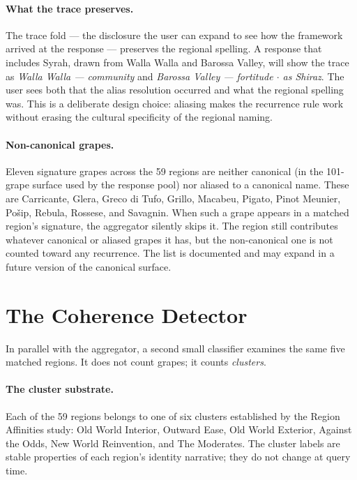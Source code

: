 \documentclass[11pt]{article}
\begin{document}
\paragraph{What the trace preserves.}
The trace fold --- the disclosure the user can expand to see how the framework arrived at the response --- preserves the regional spelling. A response that includes Syrah, drawn from Walla Walla and Barossa Valley, will show the trace as \emph{Walla Walla --- community} and \emph{Barossa Valley --- fortitude $\cdot$ as Shiraz}. The user sees both that the alias resolution occurred and what the regional spelling was. This is a deliberate design choice: aliasing makes the recurrence rule work without erasing the cultural specificity of the regional naming.

\paragraph{Non-canonical grapes.}
Eleven signature grapes across the 59 regions are neither canonical (in the 101-grape surface used by the response pool) nor aliased to a canonical name. These are Carricante, Glera, Greco di Tufo, Grillo, Macabeu, Pigato, Pinot Meunier, Po\v{s}ip, Rebula, Rossese, and Savagnin. When such a grape appears in a matched region's signature, the aggregator silently skips it. The region still contributes whatever canonical or aliased grapes it has, but the non-canonical one is not counted toward any recurrence. The list is documented and may expand in a future version of the canonical surface.

\section{The Coherence Detector}

In parallel with the aggregator, a second small classifier examines the same five matched regions. It does not count grapes; it counts \emph{clusters}.

\paragraph{The cluster substrate.}
Each of the 59 regions belongs to one of six clusters established by the Region Affinities study: Old World Interior, Outward Ease, Old World Exterior, Against the Odds, New World Reinvention, and The Moderates. The cluster labels are stable properties of each region's identity narrative; they do not change at query time.
\end{document}
